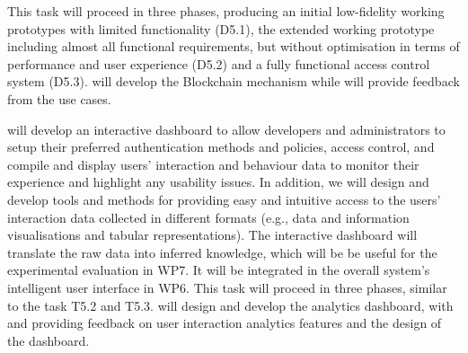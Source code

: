 \begin{Workpackage}{\thewpno}
\begin{Task}
This task will proceed in three phases, producing an initial low-fidelity working prototypes with limited functionality (D5.1), the extended working prototype including almost all functional requirements, but without optimisation in terms of performance and user experience (D5.2) and a fully functional access control system (D5.3). 
\COGNIshort{} will develop the Blockchain mechanism while \SOPRAshort{} will provide feedback from the use cases.
\end{Task}


\begin{Task}
\TaskResults{%
\ref{del:auth2},
\ref{del:auth3},
\ref{del:auth4}
}
\TaskHeader{}

\theTask will develop an interactive dashboard to allow developers and administrators to setup their preferred authentication methods and policies, access control, and compile and display users’ interaction and behaviour data to monitor their experience and highlight any usability issues. In addition, we will design and develop tools and methods for providing easy and intuitive access to the users’ interaction data collected in different formats (e.g., data and information visualisations and tabular representations). %
The interactive dashboard will translate the raw data into inferred knowledge, which will be be useful for the experimental evaluation in WP7. It will be integrated in the overall system's intelligent user interface in WP6. This task will proceed in three phases, similar to the task T5.2 and T5.3.
\COGNIshort{} will design and develop the analytics dashboard, with \SCCHshort{} and \FRQshort{} providing feedback on user interaction analytics features and the design of the dashboard.
\end{Task}


\end{Workpackage}
